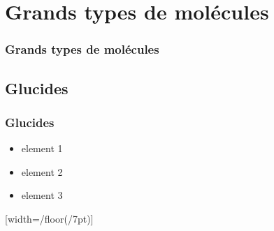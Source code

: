 \documentclass{beamer}
\begin{document}

\section{Grands types de mol{\'e}cules}
\begin{frame}
	\frametitle{Grands types de mol{\'e}cules}
	\tableofcontents[sections=3,currentsection,subsectionstyle=show/shaded/hide]
\end{frame} 

\subsection{ Glucides }
\begin{frame}
	\frametitle{ Glucides }
	\begin{itemize}
		\item element 1
		\item element 2
		\item element 3
	\end{itemize}
\end{frame}

{
  [width=\pgfdecoratedpathlength/floor(\pgfdecoratedpathlength/7pt)]
  {
    \pgfpathmoveto{\pgfpoint{-1pt}{0pt}}
    \pgfpathlineto{\pgfpoint{-1pt}{-10pt}}
    \pgfpathmoveto{\pgfpoint{1pt}{0pt}}
    \pgfpathlineto{\pgfpoint{1pt}{-10pt}}
    \pgfpathmoveto{\pgfpoint{1pt}{0pt}}
    \pgfpathcircle{\pgfpoint{0pt}{2pt}}{2.5pt}
  }
  {
    \pgfpathmoveto{\pgfpointdecoratedpathlast}
  }
}
\end{document}
